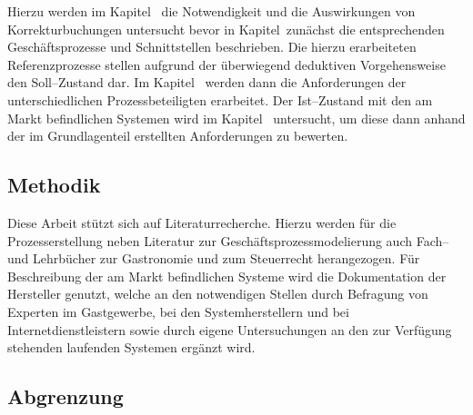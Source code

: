 Hierzu werden im Kapitel~ die Notwendigkeit und die Auswirkungen von Korrekturbuchungen untersucht bevor in Kapitel~zunächst die entsprechenden Geschäftsprozesse und Schnittstellen beschrieben. Die hierzu erarbeiteten Referenzprozesse stellen aufgrund der überwiegend deduktiven Vorgehensweise den Soll–Zustand dar. Im Kapitel~ werden dann die Anforderungen der unterschiedlichen Prozessbeteiligten erarbeitet. Der Ist–Zustand mit den am Markt befindlichen Systemen wird im Kapitel~ untersucht, um diese dann anhand der im Grundlagenteil erstellten Anforderungen zu bewerten.

\subsection{Methodik} %
\label{sub:methodik}
Diese Arbeit stützt sich auf Literaturrecherche. Hierzu werden für die Prozesserstellung neben Literatur zur Geschäftsprozessmodelierung auch Fach– und Lehrbücher zur Gastronomie und zum Steuerrecht herangezogen. Für Beschreibung der am Markt befindlichen Systeme wird die Dokumentation der Hersteller genutzt, welche an den notwendigen Stellen durch Befragung von Experten im Gastgewerbe, bei den Systemherstellern und bei Internetdienstleistern sowie durch eigene Untersuchungen an den zur Verfügung stehenden laufenden Systemen ergänzt wird.

\subsection{Abgrenzung} %
\label{sub:abgrenzung}




